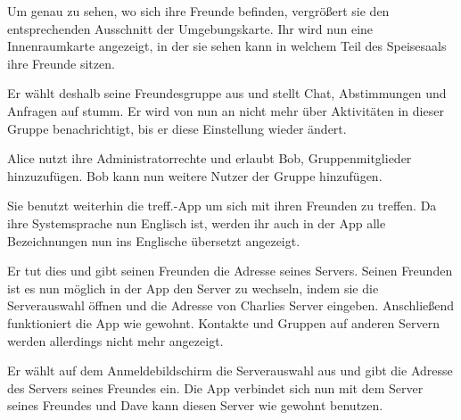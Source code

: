 \documentclass[parskip=full,11pt]{scrartcl}
\newcommand\producttitle{treff.}
\begin{document}
{Um genau zu sehen, wo sich ihre Freunde befinden, vergrößert sie den entsprechenden
Ausschnitt der Umgebungskarte.}
{Ihr wird nun eine Innenraumkarte angezeigt, in der sie sehen kann in welchem Teil
des Speisesaals ihre Freunde sitzen.}


{Er wählt deshalb seine Freundesgruppe aus und stellt Chat, Abstimmungen und Anfragen auf stumm.}
{Er wird von nun an nicht mehr über Aktivitäten in dieser Gruppe benachrichtigt,
bis er diese Einstellung wieder ändert.}

\pagebreak
{}
{Alice nutzt ihre Administratorrechte und erlaubt Bob, Gruppenmitglieder hinzuzufügen.}
{Bob kann nun weitere Nutzer der Gruppe hinzufügen.}

{Sie benutzt weiterhin die \producttitle-App um sich mit ihren Freunden zu treffen.}
{Da ihre Systemsprache nun Englisch ist, werden ihr auch in der App alle Bezeichnungen
nun ins Englische übersetzt angezeigt.}

{Er tut dies und gibt seinen Freunden die Adresse seines Servers.}
{Seinen Freunden ist es nun möglich in der App den Server zu wechseln, indem
sie die Serverauswahl öffnen und die Adresse von Charlies Server eingeben.
Anschließend funktioniert die App wie gewohnt. Kontakte und Gruppen auf anderen
Servern werden allerdings nicht mehr angezeigt.}


{Er wählt auf dem Anmeldebildschirm die Serverauswahl aus und gibt die Adresse
des Servers seines Freundes ein.}
{Die App verbindet sich nun mit dem Server seines Freundes und Dave kann
diesen Server wie gewohnt benutzen.}
\end{document}
